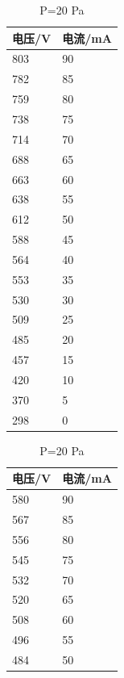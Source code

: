 \documentclass[a4paper,UTF8]{ctexart}
\begin{document}
\begin{table}[H]
    \begin{subtable}[h]{0.45\textwidth}
        \centering
        \begin{tabular}{| l | l|}
        \hline
        \textbf{电压/V} & \textbf{电流/mA} \\ \hline
        803 & 90 \\ \hline
        782 & 85 \\ \hline
        759 & 80 \\ \hline
        738 & 75 \\ \hline
        714 & 70 \\ \hline
        688 & 65 \\ \hline
        663 & 60 \\ \hline
        638 & 55 \\ \hline
        612 & 50 \\ \hline
        588 & 45 \\ \hline
        564 & 40 \\ \hline
        553 & 35 \\ \hline
        530 & 30 \\ \hline
        509 & 25 \\ \hline
        485 & 20 \\ \hline
        457 & 15 \\ \hline
        420 & 10 \\ \hline
        370 & 5 \\ \hline
        298 & 0 \\ \hline
       \end{tabular}
       \caption{P=20 Pa}
       \label{tab:p20}
    \end{subtable}
    \hfill
    \begin{subtable}[h]{0.45\textwidth}
        \centering
        \begin{tabular}{| l | l|}
\hline
        \textbf{电压/V} & \textbf{电流/mA} \\ \hline
        580 & 90 \\ \hline
        567 & 85 \\ \hline
        556 & 80 \\ \hline
        545 & 75 \\ \hline
        532 & 70 \\ \hline
        520 & 65 \\ \hline
        508 & 60 \\ \hline
        496 & 55 \\ \hline
        484 & 50 \\ \hline

\end{tabular}
\end{subtable}
\end{table}
\end{document}
